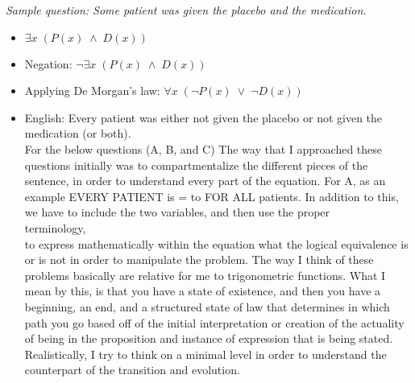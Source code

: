 {\it
Sample question: Some patient was given the placebo and the medication.\\
\begin{itemize}
  \item $\exists x\; (P(x)\; \land \; D(x))$\\
  \item Negation: $\neg \exists x\; (P(x)\; \land \; D(x))$\\
  \item Applying De Morgan's law: $\forall x\; (\neg P(x)\; \lor \; \neg D(x))$\\
  \item English: Every patient was either not given the placebo or not given the medication (or both).\\
  
  For the below questions (A, B, and C) The way that I approached these questions initially was to compartmentalize the different pieces of the sentence, in order to understand every part of the equation. For A, as an example EVERY PATIENT is = to FOR ALL patients. In addition to this, we have to include the two variables, and then use the proper\\
  
  terminology, \lor \\
  
  to express mathematically within the equation what the logical equivalence is or is not in order to manipulate the problem.
  The way I think of these problems basically are relative for me to trigonometric functions. What I mean by this, is that you have a state of existence, and then you have a beginning, an end, and a structured state of law that determines in which path you go based off of the initial interpretation or creation of the actuality of being in the proposition and instance of expression that is being stated. Realistically, I try to think on a minimal level in order to understand the counterpart of the transition and evolution.
\end{itemize}
}
\newpage

